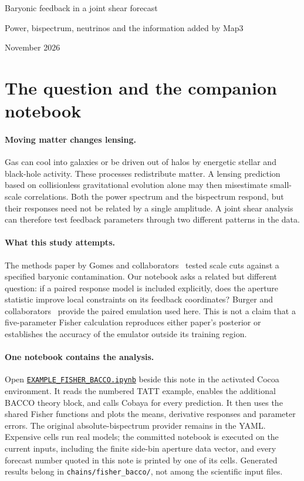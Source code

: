 \documentclass[11pt]{article}
\newcommand{\us}{\_\allowbreak}
\begin{document}
\begin{center}
{\LARGE Baryonic feedback in a joint shear forecast\par}
\vspace{.4em}
{\large Power, bispectrum, neutrinos and the information added by Map3\par}
\vspace{.6em}
{\large November 2026\par}
\end{center}

\section{The question and the companion notebook}
\paragraph{Moving matter changes lensing.}
Gas can cool into galaxies or be driven out of halos by energetic stellar
and black-hole activity. These processes redistribute matter. A lensing
prediction based on collisionless gravitational evolution alone may then
misestimate small-scale correlations. Both the power spectrum and the
bispectrum respond, but their responses need not be related by a single
amplitude. A joint shear analysis can therefore test feedback parameters
through two different patterns in the data.

\paragraph{What this study attempts.}
The methods paper by Gomes and collaborators~\cite{methods} tested scale
cuts against a specified baryonic contamination. Our notebook asks a
related but different question: if a paired response model is included
explicitly, does the aperture statistic improve local constraints on its
feedback coordinates? Burger and collaborators~\cite{burger} provide the
paired emulation used here. This is not a claim that a five-parameter
Fisher calculation reproduces either paper's posterior or establishes the
accuracy of the emulator outside its training region.

\paragraph{One notebook contains the analysis.}
Open
\href{EXAMPLE_FISHER_BACCO.ipynb}{\texttt{EXAMPLE\us FISHER\us BACCO.ipynb}}
beside this note in the activated Cocoa environment. It reads the numbered
TATT example, enables the additional BACCO theory block, and calls Cobaya
for every prediction. It then uses the shared Fisher functions and plots
the means, derivative responses and parameter errors. The original
absolute-bispectrum provider remains in the YAML. Expensive cells run real
models; the committed notebook is executed on the current inputs, including
the finite side-bin aperture data vector, and every forecast number quoted
in this note is printed by one of its cells. Generated results belong in
\texttt{chains/fisher\us bacco/}, not among the scientific input files.
\end{document}
